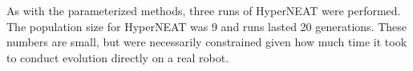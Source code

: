 

As with the parameterized methods, three runs of HyperNEAT
were performed. The population size for HyperNEAT was 9 and runs
lasted 20 generations. These numbers are small, but were necessarily
constrained given how much time it took to conduct evolution directly
on a real robot.



